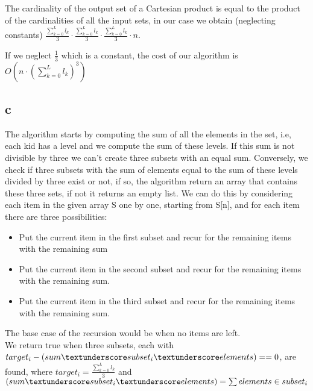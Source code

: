 \documentclass{article}
\begin{document}
The cardinality of the output set of a Cartesian product is equal to the product of the cardinalities of all the input sets, in our case we obtain (neglecting constants) $ \frac{\sum_{k=0}^{L} l_{k}}{3}  \cdot \frac{\sum_{k=0}^{L} l_{k}}{3} \cdot \frac{\sum_{k=0}^{L} l_{k}}{3} \cdot n $.

If we neglect $\frac{1}{3}$ which is a constant, the cost of our algorithm is $O(n \cdot (\sum_{k=0}^{L} l_{k})^{3})$

\subsection{c}

The algorithm starts by computing the sum of all the elements in the set, i.e, each kid has a level and we compute the sum of these levels. If this sum is not divisible by three we can't create three subsets with an equal sum. Conversely, we check if three subsets with the sum of elements equal to the sum of these levels divided by three exist or not, if so, the algorithm return an array that contains these three sets, if not it returns an empty list.
We can do this by considering each item in the given array S one by one, starting from S[n], and for each item there are three possibilities:
\begin{itemize}
\item Put the current item in the first subset and recur for the remaining items with the remaining sum
\item Put the current item in the second subset and recur for the remaining items with the remaining sum.
\item Put the current item in the third subset and recur for the remaining items with the remaining sum.
\end{itemize}
The base case of the recursion would be when no items are left. \\

We return true when three subsets, each with $target_{i} - (sum\textunderscore subset_{i} \textunderscore elements) ==0$, are found, where $target_{i} =  \frac{\sum_{k=0}^{L} l_{k}}{3}$ and $(sum\textunderscore subset_{i} \textunderscore elements) = \sum elements \in subset_{i} $ \\
\end{document}
